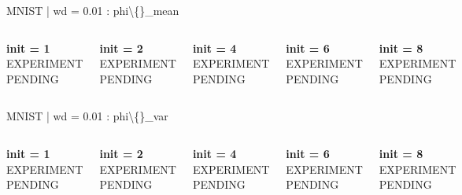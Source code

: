 \documentclass[aspectratio=169]{beamer}
\begin{document}
\begin{frame}{MNIST | wd = 0.01 : phi\textbackslash\{\}\_mean}
\begin{columns}[T,onlytextwidth]

    \centering
\textbf{init = 1}\\[0.5em]
\vfill
{\Large EXPERIMENT PENDING}
\vfill

    \centering
\textbf{init = 2}\\[0.5em]
\vfill
{\Large EXPERIMENT PENDING}
\vfill

    \centering
\textbf{init = 4}\\[0.5em]
\vfill
{\Large EXPERIMENT PENDING}
\vfill

    \centering
\textbf{init = 6}\\[0.5em]
\vfill
{\Large EXPERIMENT PENDING}
\vfill

    \centering
\textbf{init = 8}\\[0.5em]
\vfill
{\Large EXPERIMENT PENDING}
\vfill
\end{columns}
\end{frame}
\begin{frame}{MNIST | wd = 0.01 : phi\textbackslash\{\}\_var}
\begin{columns}[T,onlytextwidth]

    \centering
\textbf{init = 1}\\[0.5em]
\vfill
{\Large EXPERIMENT PENDING}
\vfill

    \centering
\textbf{init = 2}\\[0.5em]
\vfill
{\Large EXPERIMENT PENDING}
\vfill

    \centering
\textbf{init = 4}\\[0.5em]
\vfill
{\Large EXPERIMENT PENDING}
\vfill

    \centering
\textbf{init = 6}\\[0.5em]
\vfill
{\Large EXPERIMENT PENDING}
\vfill

    \centering
\textbf{init = 8}\\[0.5em]
\vfill
{\Large EXPERIMENT PENDING}
\vfill
\end{columns}
\end{frame}
\end{document}
